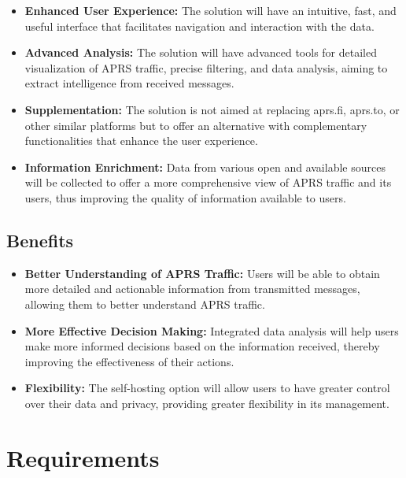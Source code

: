 \begin{itemize}
	\item \textbf{Enhanced User Experience:} The solution will have an intuitive, fast, and useful interface that facilitates navigation and interaction with the data.
	\item \textbf{Advanced Analysis:} The solution will have advanced tools for detailed visualization of APRS traffic, precise filtering, and data analysis, aiming to extract intelligence from received messages.
	
	\item \textbf{Supplementation:} The solution is not aimed at replacing aprs.fi, aprs.to, or other similar platforms but to offer an alternative with complementary functionalities that enhance the user experience.
	
	\item \textbf{Information Enrichment:} Data from various open and available sources will be collected to offer a more comprehensive view of APRS traffic and its users, thus improving the quality of information available to users.
\end{itemize}

\subsection{Benefits}

\begin{itemize}
	\item \textbf{Better Understanding of APRS Traffic:} Users will be able to obtain more detailed and actionable information from transmitted messages, allowing them to better understand APRS traffic.
	
	\item \textbf{More Effective Decision Making:} Integrated data analysis will help users make more informed decisions based on the information received, thereby improving the effectiveness of their actions.
	
	\item \textbf{Flexibility:} The self-hosting option will allow users to have greater control over their data and privacy, providing greater flexibility in its management.
	
\end{itemize}

\section{Requirements}

